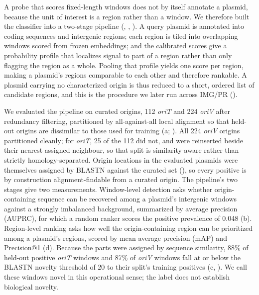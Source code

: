 A probe that scores fixed-length windows does not by itself annotate a
plasmid, because the unit of interest is a region rather than a window. We
therefore built the classifier into a two-stage pipeline
(, , ).
A query plasmid is annotated into coding sequences and intergenic regions;
each region is tiled into overlapping windows scored from frozen \model
embeddings; and the calibrated scores give a probability profile that
localizes signal to part of a region rather than only flagging the region as
a whole. Pooling that profile yields one score per region, making a plasmid's
regions comparable to each other and therefore rankable. A plasmid carrying no
characterized origin is thus reduced to a short, ordered list of candidate
regions, and this is the procedure we later run across IMG/PR
().

We evaluated the pipeline on curated origins, 112 \emph{oriT} and 224
\emph{oriV} after redundancy filtering, partitioned by all-against-all local
alignment so that held-out origins are dissimilar to those used for training
(a;
). All 224
\emph{oriV} origins partitioned cleanly; for \emph{oriT}, 25 of the 112 did
not, and were reinserted beside their nearest assigned neighbour, so that
split is similarity-aware rather than strictly homology-separated.
Origin locations in the evaluated plasmids were themselves assigned by BLASTN
against the curated set (), so every positive is by
construction alignment-findable from a curated origin. The
pipeline's two stages give two measurements. Window-level detection asks
whether origin-containing sequence can be recovered among a plasmid's
intergenic windows against a strongly imbalanced background, summarized by
average precision (AUPRC), for which a random ranker scores the positive
prevalence of 0.048 (b). Region-level ranking asks how well the
origin-containing region can be prioritized among a plasmid's regions, scored
by mean average precision (mAP) and Precision@1 (d). Because
the parts were assigned by sequence similarity, 88\% of held-out positive
\emph{oriT} windows and 87\% of \emph{oriV} windows fall at or below the
BLASTN \cite{camacho2009blast} novelty threshold of 20 to their split's
training positives (c,
). We call these windows novel in this operational sense;
the label does not establish biological novelty.


